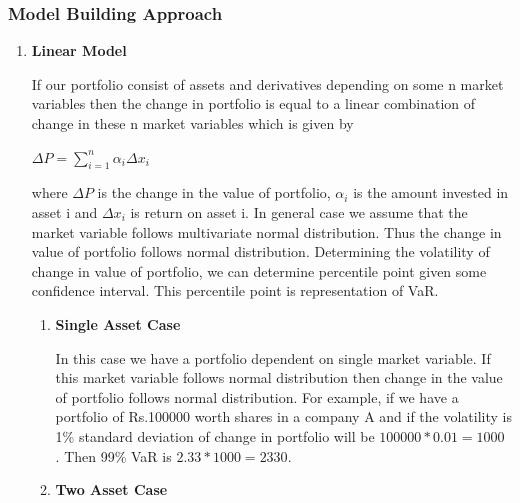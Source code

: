 \documentclass[11pt]{article}
\numberwithin{equation}{section}
\begin{document}
	\subsubsection{Model Building Approach}
	\medskip
	\begin{enumerate}
		\item\textbf{Linear Model}
		\medskip
				
		If our portfolio consist of assets and derivatives depending on some n market variables then the change in portfolio is equal to a linear combination of change in these n market variables which is given by
\begin{center}
 $ {\Delta}P  =  \sum_{i=1}^n{\alpha_i}{\Delta}{x_i} $
\end{center}
	where ${\Delta}P $ is the change in the value of portfolio,
	$\alpha_i$ is the amount invested in asset i and ${\Delta}{x_i}$  is return on asset i.
		  In general case we assume that the market variable follows multivariate normal distribution. Thus the change in value of portfolio follows normal distribution. Determining the volatility of change in value of portfolio, we can determine percentile point given some confidence interval. This percentile point is representation of VaR. 
		
		\begin{enumerate}
		\item\textbf{Single Asset Case}
		\medskip
		
		In this case we have a portfolio dependent on single market variable. If this market variable follows normal distribution then change in the value of portfolio follows normal distribution. For example, if we have a portfolio of Rs.100000 worth shares in a company A and if the volatility is 1\% standard deviation of change in portfolio will be $ 100000*0.01=1000 $ . Then 99\% VaR is $ 2.33*1000=2330 $.
		\medskip
		
		 \item\textbf{Two Asset Case} 
		 \medskip
		 

\end{enumerate}
\end{enumerate}
\end{document}
